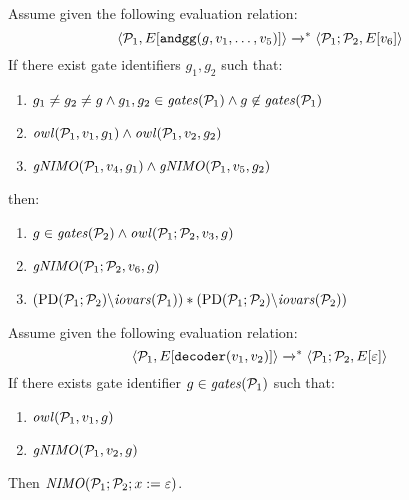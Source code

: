 \begin{lemma}
Assume given the following evaluation relation:
$$
\langle \mathcal{P}_1,E[\texttt{andgg}(g,v_1,\ldots,v_5)] \rangle \xrightarrow{}^{*} \langle \mathcal{P}_1;\mathcal{P}_2,E[v_6] \rangle
$$
If there exist gate identifiers $g_1, g_2$ such that:
\begin{enumerate}
  \item $g_1 \ne g_2 \ne g \wedge g_1,g_2 \in \mathit{gates}(\mathcal{P}_1) \wedge g \not\in \mathit{gates}(\mathcal{P}_1)$
  \item $\mathit{owl}(\mathcal{P}_1,v_1,g_1) \wedge \mathit{owl}(\mathcal{P}_1,v_2,g_2)$
  \item $\mathit{gNIMO}(\mathcal{P}_1,v_4,g_1) \wedge \mathit{gNIMO}(\mathcal{P}_1,v_5,g_2)$
\end{enumerate}
then:
\begin{enumerate}
  \item $g \in \mathit{gates}(\mathcal{P}_2) \wedge \mathit{owl}(\mathcal{P}_1;\mathcal{P}_2,v_3,g)$
  \item $\mathit{gNIMO}(\mathcal{P}_1;\mathcal{P}_2,v_6,g)$
  \item $(\mathrm{PD}(\mathcal{P}_1;\mathcal{P}_2)\backslash\mathit{iovars}(\mathcal{P}_1)) * (\mathrm{PD}(\mathcal{P}_1;\mathcal{P}_2)\backslash\mathit{iovars}(\mathcal{P}_2))$
\end{enumerate}
\end{lemma}

\begin{lemma}[Decoding]
Assume given the following evaluation relation:
$$
\langle \mathcal{P}_1,E[\texttt{decoder}(v_1,v_2)] \rangle \xrightarrow{}^{*} \langle \mathcal{P}_1;\mathcal{P}_2,E[\varepsilon] \rangle
$$
If there exists gate identifier $g \in \mathit{gates}(\mathcal{P}_1)$ such that:
\begin{enumerate}
  \item $\mathit{owl}(\mathcal{P}_1,v_1,g)$
  \item $\mathit{gNIMO}(\mathcal{P}_1,v_2,g)$
\end{enumerate}
Then $\mathit{NIMO}(\mathcal{P}_1;\mathcal{P}_2;x := \varepsilon)$.
\end{lemma}
